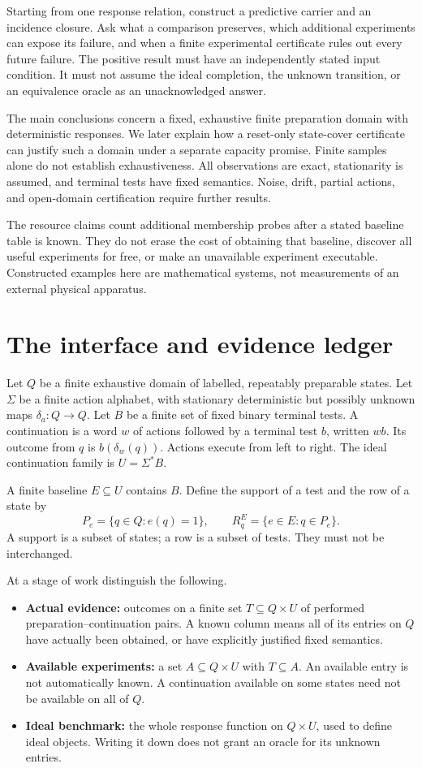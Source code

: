 \documentclass[11pt]{article}
\theoremstyle{remark}
\begin{document}
Starting from one response relation, construct a predictive carrier and an incidence closure. Ask what a comparison preserves, which additional experiments can expose its failure, and when a finite experimental certificate rules out every future failure. The positive result must have an independently stated input condition. It must not assume the ideal completion, the unknown transition, or an equivalence oracle as an unacknowledged answer.

The main conclusions concern a fixed, exhaustive finite preparation domain with deterministic responses. We later explain how a reset-only state-cover certificate can justify such a domain under a separate capacity promise. Finite samples alone do not establish exhaustiveness. All observations are exact, stationarity is assumed, and terminal tests have fixed semantics. Noise, drift, partial actions, and open-domain certification require further results.

The resource claims count additional membership probes after a stated baseline table is known. They do not erase the cost of obtaining that baseline, discover all useful experiments for free, or make an unavailable experiment executable. Constructed examples here are mathematical systems, not measurements of an external physical apparatus.

\section{The interface and evidence ledger}
\label{sec:interface}

Let $Q$ be a finite exhaustive domain of labelled, repeatably preparable states. Let $\Sigma$ be a finite action alphabet, with stationary deterministic but possibly unknown maps $\delta_a:Q\to Q$. Let $B$ be a finite set of fixed binary terminal tests. A continuation is a word $w$ of actions followed by a terminal test $b$, written $wb$. Its outcome from $q$ is $b(\delta_w(q))$. Actions execute from left to right. The ideal continuation family is $U=\Sigma^*B$.

A finite baseline $E\subseteq U$ contains $B$. Define the support of a test and the row of a state by
\[
 P_e=\{q\in Q:e(q)=1\},\qquad
 R_q^E=\{e\in E:q\in P_e\}.
\]
A support is a subset of states; a row is a subset of tests. They must not be interchanged.

At a stage of work distinguish the following.
\begin{itemize}
\item \textbf{Actual evidence:} outcomes on a finite set $T\subseteq Q\times U$ of performed preparation--continuation pairs. A known column means all of its entries on $Q$ have actually been obtained, or have explicitly justified fixed semantics.
\item \textbf{Available experiments:} a set $A\subseteq Q\times U$ with $T\subseteq A$. An available entry is not automatically known. A continuation available on some states need not be available on all of $Q$.
\item \textbf{Ideal benchmark:} the whole response function on $Q\times U$, used to define ideal objects. Writing it down does not grant an oracle for its unknown entries.
\end{itemize}
\end{document}
